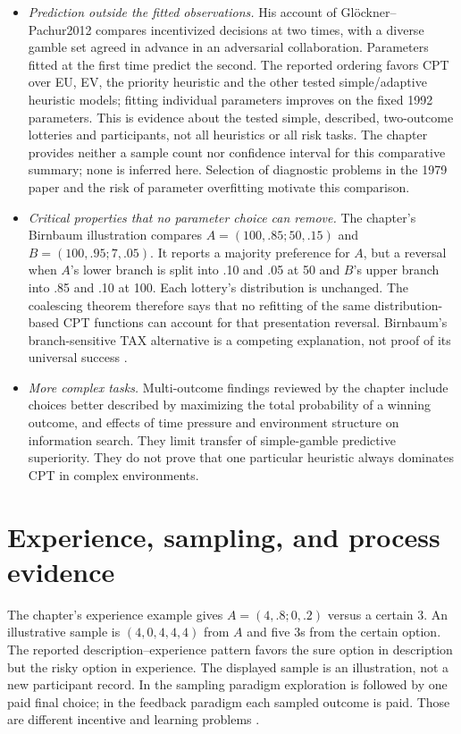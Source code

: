 \begin{itemize}
\item \emph{Prediction outside the fitted observations.} His account of
Gl\"ockner--Pachur2012 compares incentivized decisions at two times,
with a diverse gamble set agreed in advance in an adversarial
collaboration. Parameters fitted at the first time predict the second.
The reported ordering favors CPT over EU, EV, the priority heuristic
and the other tested simple/adaptive heuristic models; fitting individual
parameters improves on the fixed 1992 parameters. This is evidence about
the tested simple, described, two-outcome lotteries and participants,
not all heuristics or all risk tasks. The chapter provides neither a
sample count nor confidence interval for this comparative summary;
none is inferred here. Selection of diagnostic problems in the 1979
paper and the risk of parameter overfitting motivate this comparison.
\item \emph{Critical properties that no parameter choice can remove.}
The chapter's Birnbaum illustration compares
\(A=(100,.85;50,.15)\) and \(B=(100,.95;7,.05)\).
It reports a majority preference for \(A\), but a reversal when
\(A\)'s lower branch is split into .10 and .05 at 50 and
\(B\)'s upper branch into .85 and .10 at 100. Each lottery's
distribution is unchanged. The coalescing theorem therefore says
that no refitting of the same distribution-based CPT functions can
account for that presentation reversal. Birnbaum's branch-sensitive
TAX alternative is a competing explanation, not proof of its universal
success \cite[pp.~463--465]{Birnbaum2008Paradoxes}.
\item \emph{More complex tasks.} Multi-outcome findings reviewed by
the chapter include choices better described by maximizing the total
probability of a winning outcome, and effects of time pressure and
environment structure on information search. They limit transfer
of simple-gamble predictive superiority. They do not prove that one
particular heuristic always dominates CPT in complex environments.
\end{itemize}

\section{Experience, sampling, and process evidence}

The chapter's experience example gives
\(A=(4,.8;0,.2)\) versus a certain 3. An illustrative sample is
\((4,0,4,4,4)\) from \(A\) and five 3s from the certain option.
The reported description--experience pattern favors the sure option
in description but the risky option in experience. The displayed
sample is an illustration, not a new participant record. In the
sampling paradigm exploration is followed by one paid final choice;
in the feedback paradigm each sampled outcome is paid. Those are
different incentive and learning problems
\cite[pp.~489--490, note~6]{Glockner2021ProspectTheory}.

